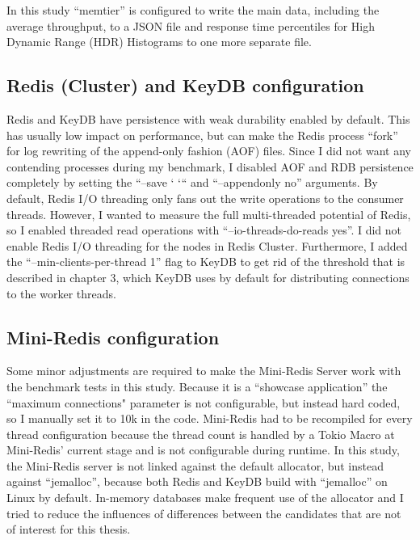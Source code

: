 In this study “memtier” is configured to write the main data, including the average throughput, to a JSON file and response time percentiles for High Dynamic Range (HDR) Histograms to one more separate file.

\subsection{Redis (Cluster) and KeyDB configuration}
Redis and KeyDB have persistence with weak durability enabled by default. This has usually low impact on performance, but can make the Redis process “fork” for log rewriting of the append-only fashion (AOF) files. Since I did not want any contending processes during my benchmark, I disabled AOF and RDB persistence completely by setting the “--save ‘ ‘“ and “--appendonly no” arguments.  \newline
By default, Redis I/O threading only fans out the write operations to the consumer threads. However, I wanted to measure the full multi-threaded potential of Redis, so I enabled threaded read operations with “--io-threads-do-reads yes”.  \newline
I did not enable Redis I/O threading for the nodes in Redis Cluster.  \newline
Furthermore, I added the “--min-clients-per-thread 1” flag to KeyDB to get rid of the threshold that is described in chapter 3, which KeyDB uses by default for distributing connections to the worker threads.

\subsection{Mini-Redis configuration}
Some minor adjustments are required to make the Mini-Redis Server work with the benchmark tests in this study. Because it is a “showcase application” the “maximum connections" parameter is not configurable, but instead hard coded, so I manually set it to 10k in the code. Mini-Redis had to be recompiled for every thread configuration because the thread count is handled by a Tokio Macro at Mini-Redis’ current stage and is not configurable during runtime. In this study, the Mini-Redis server is not linked against the default allocator, but instead against “jemalloc”, because both Redis and KeyDB build with “jemalloc” on Linux by default. In-memory databases make frequent use of the allocator and I tried to reduce the influences of differences between the candidates that are not of interest for this thesis.

